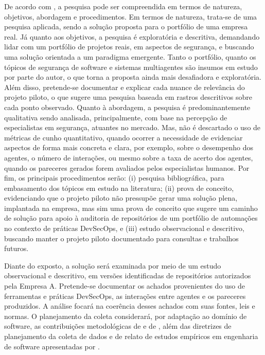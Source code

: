 De acordo com , a pesquisa pode ser compreendida em termos de natureza, objetivos, abordagem e procedimentos. Em termos de natureza, trata-se de uma pesquisa aplicada, sendo a solução proposta para o portfólio de uma empresa real. Já quanto aos objetivos, a pesquisa é exploratória e descritiva, demandando lidar com um portfólio de projetos reais, em aspectos de segurança, e buscando uma solução orientada a um paradigma emergente. Tanto o portfólio, quanto os tópicos de segurança de software e sistemas multiagentes são insumos em estudo por parte do autor, o que torna a proposta ainda mais desafiadora e exploratória. Além disso, pretende-se documentar e explicar cada nuance de relevância do projeto piloto, o que sugere uma pesquisa baseada em rastros descritivos sobre cada ponto observado. Quanto à abordagem, a pesquisa é predominantemente qualitativa sendo analisada, principalmente, com base na percepção de especialistas em segurança, atuantes no mercado. Mas, não é descartado o uso de métricas de cunho quantitativo, quando ocorrer a necessidade de evidenciar aspectos de forma mais concreta e clara, por exemplo, sobre o desempenho dos agentes, o número de interações, ou mesmo sobre a taxa de acerto dos agentes, quando os pareceres gerados forem avaliados pelos especialistas humanos. Por fim, os principais procedimentos serão: (i) pesquisa bibliográfica, para embasamento dos tópicos em estudo na literatura; (ii) prova de conceito, evidenciando que o projeto piloto não pressupõe gerar uma solução plena, implantada na empresa, mas sim uma prova de conceito que sugere um caminho de solução para apoio à auditoria de repositórios de um portfólio de automações no contexto de práticas DevSecOps, e (iii) estudo observacional e descritivo, buscando manter o projeto piloto documentado para consultas e trabalhos futuros.

Diante do exposto, a solução será examinada por meio de um estudo observacional e descritivo, em versões identificadas de repositórios autorizados pela Empresa A. Pretende-se documentar os achados provenientes do uso de ferramentas e práticas DevSecOps, as interações entre agentes e os pareceres produzidos. A análise focará na coerência desses achados com suas fontes, leis e normas. O planejamento da coleta considerará, por adaptação ao domínio de software, as contribuições metodológicas de  e de , além das diretrizes de planejamento da coleta de dados e de relato de estudos empíricos em engenharia de software apresentadas por .

